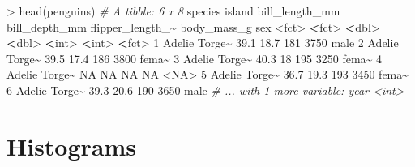 \documentclass[
]{book}
\newenvironment{Shaded}{\begin{snugshade}}{\end{snugshade}}
\newcommand{\CommentTok}[1]{\textcolor[rgb]{0.56,0.35,0.01}{\textit{#1}}}
\newcommand{\ConstantTok}[1]{\textcolor[rgb]{0.00,0.00,0.00}{#1}}
\newcommand{\DecValTok}[1]{\textcolor[rgb]{0.00,0.00,0.81}{#1}}
\newcommand{\ErrorTok}[1]{\textcolor[rgb]{0.64,0.00,0.00}{\textbf{#1}}}
\newcommand{\FloatTok}[1]{\textcolor[rgb]{0.00,0.00,0.81}{#1}}
\newcommand{\FunctionTok}[1]{\textcolor[rgb]{0.00,0.00,0.00}{#1}}
\newcommand{\NormalTok}[1]{#1}
\newcommand{\SpecialCharTok}[1]{\textcolor[rgb]{0.00,0.00,0.00}{#1}}
\begin{document}
\begin{Shaded}
\begin{Highlighting}[]
\SpecialCharTok{\textgreater{}} \FunctionTok{head}\NormalTok{(penguins)}
\CommentTok{\# A tibble: 6 x 8}
\NormalTok{  species island bill\_length\_mm bill\_depth\_mm flipper\_length\_}\SpecialCharTok{\textasciitilde{}}\NormalTok{ body\_mass\_g sex  }
  \SpecialCharTok{\textless{}}\NormalTok{fct}\SpecialCharTok{\textgreater{}}   \ErrorTok{\textless{}}\NormalTok{fct}\SpecialCharTok{\textgreater{}}           \ErrorTok{\textless{}}\NormalTok{dbl}\SpecialCharTok{\textgreater{}}         \ErrorTok{\textless{}}\NormalTok{dbl}\SpecialCharTok{\textgreater{}}            \ErrorTok{\textless{}}\NormalTok{int}\SpecialCharTok{\textgreater{}}       \ErrorTok{\textless{}}\NormalTok{int}\SpecialCharTok{\textgreater{}} \ErrorTok{\textless{}}\NormalTok{fct}\SpecialCharTok{\textgreater{}}
\DecValTok{1}\NormalTok{ Adelie  Torge}\SpecialCharTok{\textasciitilde{}}           \FloatTok{39.1}          \FloatTok{18.7}              \DecValTok{181}        \DecValTok{3750}\NormalTok{ male }
\DecValTok{2}\NormalTok{ Adelie  Torge}\SpecialCharTok{\textasciitilde{}}           \FloatTok{39.5}          \FloatTok{17.4}              \DecValTok{186}        \DecValTok{3800}\NormalTok{ fema}\SpecialCharTok{\textasciitilde{}}
\DecValTok{3}\NormalTok{ Adelie  Torge}\SpecialCharTok{\textasciitilde{}}           \FloatTok{40.3}          \DecValTok{18}                \DecValTok{195}        \DecValTok{3250}\NormalTok{ fema}\SpecialCharTok{\textasciitilde{}}
\DecValTok{4}\NormalTok{ Adelie  Torge}\SpecialCharTok{\textasciitilde{}}           \ConstantTok{NA}            \ConstantTok{NA}                 \ConstantTok{NA}          \ConstantTok{NA} \SpecialCharTok{\textless{}}\ConstantTok{NA}\SpecialCharTok{\textgreater{}} 
\DecValTok{5}\NormalTok{ Adelie  Torge}\SpecialCharTok{\textasciitilde{}}           \FloatTok{36.7}          \FloatTok{19.3}              \DecValTok{193}        \DecValTok{3450}\NormalTok{ fema}\SpecialCharTok{\textasciitilde{}}
\DecValTok{6}\NormalTok{ Adelie  Torge}\SpecialCharTok{\textasciitilde{}}           \FloatTok{39.3}          \FloatTok{20.6}              \DecValTok{190}        \DecValTok{3650}\NormalTok{ male }
\CommentTok{\# ... with 1 more variable: year \textless{}int\textgreater{}}
\end{Highlighting}
\end{Shaded}

\hypertarget{histograms}{%
\section{Histograms}\label{histograms}}
\end{document}
